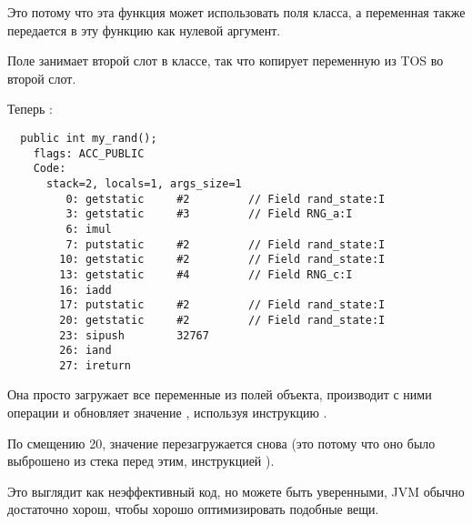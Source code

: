 Это потому что эта функция может использовать поля класса, а переменная  
также передается в эту функцию как нулевой аргумент.

Поле  занимает второй слот в классе,
так что  копирует переменную из \ac{TOS} во второй слот.

Теперь :

\begin{lstlisting}
  public int my_rand();
    flags: ACC_PUBLIC
    Code:
      stack=2, locals=1, args_size=1
         0: getstatic     #2         // Field rand_state:I
         3: getstatic     #3         // Field RNG_a:I
         6: imul          
         7: putstatic     #2         // Field rand_state:I
        10: getstatic     #2         // Field rand_state:I
        13: getstatic     #4         // Field RNG_c:I
        16: iadd          
        17: putstatic     #2         // Field rand_state:I
        20: getstatic     #2         // Field rand_state:I
        23: sipush        32767
        26: iand          
        27: ireturn       
\end{lstlisting}


Она просто загружает все переменные из полей объекта, производит с ними операции
и обновляет значение , используя инструкцию .

По смещению 20, значение  перезагружается снова
(это потому что оно было выброшено из стека перед этим, инструкцией ).

Это выглядит как неэффективный код, но можете быть уверенными, \ac{JVM} обычно достаточно
хорош, чтобы хорошо оптимизировать подобные вещи.
